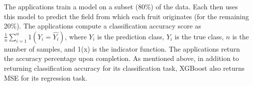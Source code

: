 The applications train a model on a subset (80\%) of the
data.  Each then uses this model to predict the field
from which each fruit originates (for the remaining 20\%). 
The applications compute a classification accuracy score
as $\frac{1}{n}\sum_{i=1}^{n}1(Y_i = \hat{Y_i})$, where $Y_i$ is the
prediction class, $Y_i$ is the true class, 
$n$ is the number of samples, and 1(x)
is the indicator function. The applications return the accuracy percentage
upon completion. As mentioned above, in addition to returning
classification accuracy for its classification task, XGBoost also returns 
MSE for its regression task.







